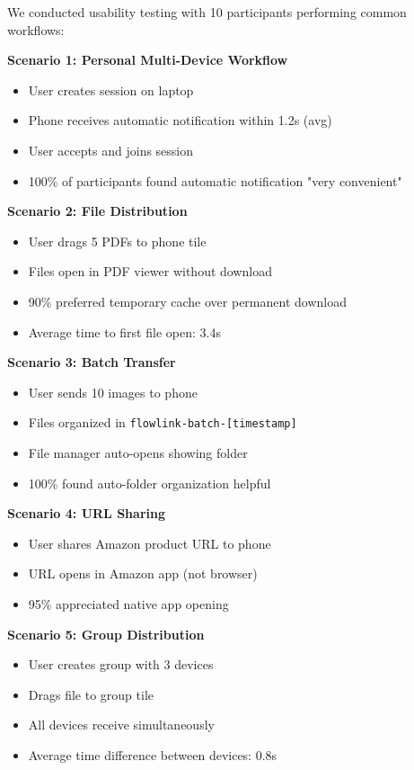 \documentclass[conference]{IEEEtran}
\begin{document}
We conducted usability testing with 10 participants performing common workflows:

\textbf{Scenario 1: Personal Multi-Device Workflow}
\begin{itemize}
    \item User creates session on laptop
    \item Phone receives automatic notification within 1.2s (avg)
    \item User accepts and joins session
    \item 100\% of participants found automatic notification "very convenient"
\end{itemize}

\textbf{Scenario 2: File Distribution}
\begin{itemize}
    \item User drags 5 PDFs to phone tile
    \item Files open in PDF viewer without download
    \item 90\% preferred temporary cache over permanent download
    \item Average time to first file open: 3.4s
\end{itemize}

\textbf{Scenario 3: Batch Transfer}
\begin{itemize}
    \item User sends 10 images to phone
    \item Files organized in \texttt{flowlink-batch-[timestamp]}
    \item File manager auto-opens showing folder
    \item 100\% found auto-folder organization helpful
\end{itemize}

\textbf{Scenario 4: URL Sharing}
\begin{itemize}
    \item User shares Amazon product URL to phone
    \item URL opens in Amazon app (not browser)
    \item 95\% appreciated native app opening
\end{itemize}

\textbf{Scenario 5: Group Distribution}
\begin{itemize}
    \item User creates group with 3 devices
    \item Drags file to group tile
    \item All devices receive simultaneously
    \item Average time difference between devices: 0.8s
\end{itemize}
\end{document}
